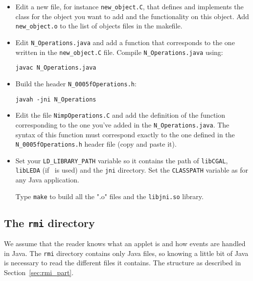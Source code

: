 \begin{itemize}
\item Edit a new file, for instance \texttt{new\_object.C},
      that defines and implements the class for the object you want to add
      and the functionality on this object. Add \texttt{new\_object.o} to 
      the list of objects files in the makefile.
\item Edit \texttt{N\_Operations.java} and add a function
      that corresponds to the one written in the \texttt{new\_object.C} file. 
      Compile \texttt{N\_Operations.java} using: \\
      \centerline{\texttt{javac  N\_Operations.java }}
\item Build the header \texttt{N\_0005fOperations.h}:  \\
      \centerline{\texttt{javah -jni N\_Operations}}
\item Edit the file \texttt{NimpOperations.C} and add the
      definition of the function corresponding to the one you've added in
      the \texttt{N\_Operations.java}. The syntax of this function must 
      correspond exactly to the one defined in the \texttt{N\_0005fOperations.h}
      header file (copy and paste it).
\item Set your {\tt LD\_LIBRARY\_PATH} variable
      so it 
      contains the path of \texttt{libCGAL}, \texttt{libLEDA} (if \leda\ is 
      used) and the \texttt{jni} directory. Set the \texttt{CLASSPATH} variable 
      as for any Java application.

      Type {\tt make} to build all the ".o" files
      and the \texttt{libjni.so} library.
\end{itemize}

\subsection{The \texttt{rmi} directory}
\label{sec:rmi_directory}

We assume that the reader knows what an applet is and how events are
handled in Java. The \texttt{rmi} directory contains only Java files, so 
knowing a little bit of Java is necessary to read the different files it
contains. The structure as described in Section~\ref{sec:rmi_part}. 

